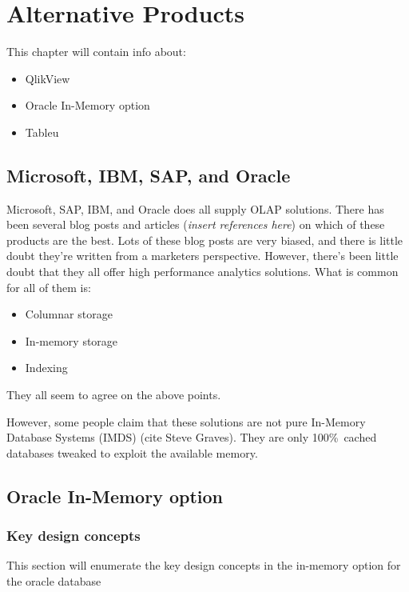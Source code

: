 \chapter{Alternative Products}
\label{chap:alternative-products}

This chapter will contain info about:

\begin{itemize}
  \item QlikView
  \item Oracle In-Memory option
  \item Tableu
\end{itemize}

\section{Microsoft, IBM, SAP, and Oracle}
Microsoft, SAP, IBM, and Oracle does all supply OLAP solutions. There has been several blog posts and articles (\textit{insert references here}) on which of these products are the best. Lots of these blog posts are very biased, and there is little doubt they're written from a marketers perspective. However, there's been little doubt that they all offer high performance analytics solutions. What is common for all of them is:
\begin{itemize}
  \item Columnar storage
  \item In-memory storage
  \item Indexing
\end{itemize}

They all seem to agree on the above points.

However, some people claim that these solutions are not pure In-Memory Database Systems (IMDS) (cite Steve Graves). They are only 100\%~cached databases tweaked to exploit the available memory.

\section{Oracle In-Memory option}
\label{sec:Oracle In-Memory option}

\subsection{Key design concepts}
\label{sub:Key design concepts}
This section will enumerate the key design concepts in the in-memory option for the oracle database

